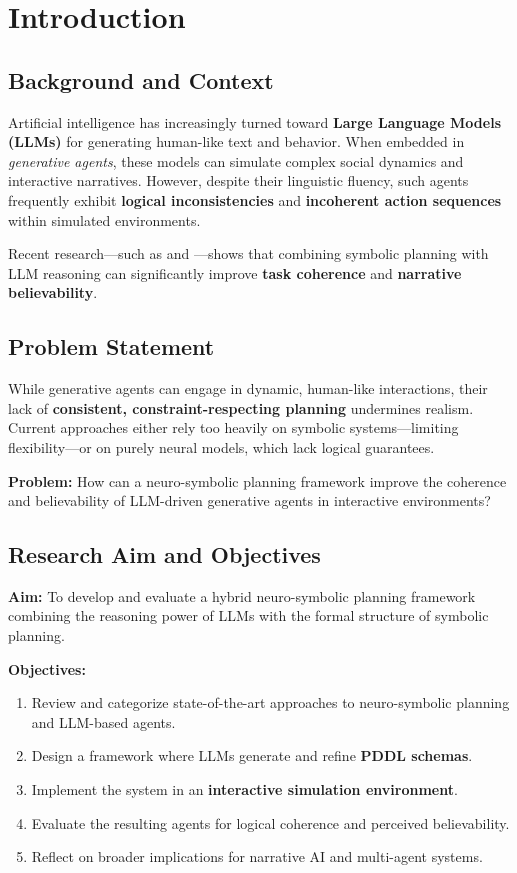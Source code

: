 \chapter{Introduction}

\section{Background and Context}
Artificial intelligence has increasingly turned toward \textbf{Large Language Models (LLMs)} for generating human-like text and behavior. When embedded in \textit{generative agents}, these models can simulate complex social dynamics and interactive narratives. However, despite their linguistic fluency, such agents frequently exhibit \textbf{logical inconsistencies} and \textbf{incoherent action sequences} within simulated environments.

Recent research—such as \cite{park2023} and \cite{zhao2023}—shows that combining symbolic planning with LLM reasoning can significantly improve \textbf{task coherence} and \textbf{narrative believability}.

\section{Problem Statement}
While generative agents can engage in dynamic, human-like interactions, their lack of \textbf{consistent, constraint-respecting planning} undermines realism. Current approaches either rely too heavily on symbolic systems—limiting flexibility—or on purely neural models, which lack logical guarantees.

\textbf{Problem:}  
How can a neuro-symbolic planning framework improve the coherence and believability of LLM-driven generative agents in interactive environments?

\section{Research Aim and Objectives}
\textbf{Aim:}  
To develop and evaluate a hybrid neuro-symbolic planning framework combining the reasoning power of LLMs with the formal structure of symbolic planning.

\textbf{Objectives:}
\begin{enumerate}
\item Review and categorize state-of-the-art approaches to neuro-symbolic planning and LLM-based agents.  
\item Design a framework where LLMs generate and refine \textbf{PDDL schemas}.  
\item Implement the system in an \textbf{interactive simulation environment}.  
\item Evaluate the resulting agents for logical coherence and perceived believability.  
\item Reflect on broader implications for narrative AI and multi-agent systems.
\end{enumerate}

